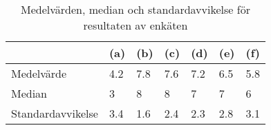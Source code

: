 \begin{table}
    \centering
    \begin{tabular}{| l | l | l | l | l | l | l |}
        \cline{2-7}
        \multicolumn{1}{c|}{} & (a) & (b) & (c) & (d) & (e) & (f) \\ \hline
        Medelvärde & 4.2 & 7.8 & 7.6 & 7.2 & 6.5 & 5.8  \\ \hline
        Median & 3 & 8 & 8 & 7 & 7 & 6  \\ \hline
        Standardavvikelse & 3.4 & 1.6 & 2.4 & 2.3 & 2.8 & 3.1  \\ \hline
    \end{tabular}
    \caption{Medelvärden, median och standardavvikelse för resultaten av enkäten}
    \label{tab:poll_results_table}
\end{table}






